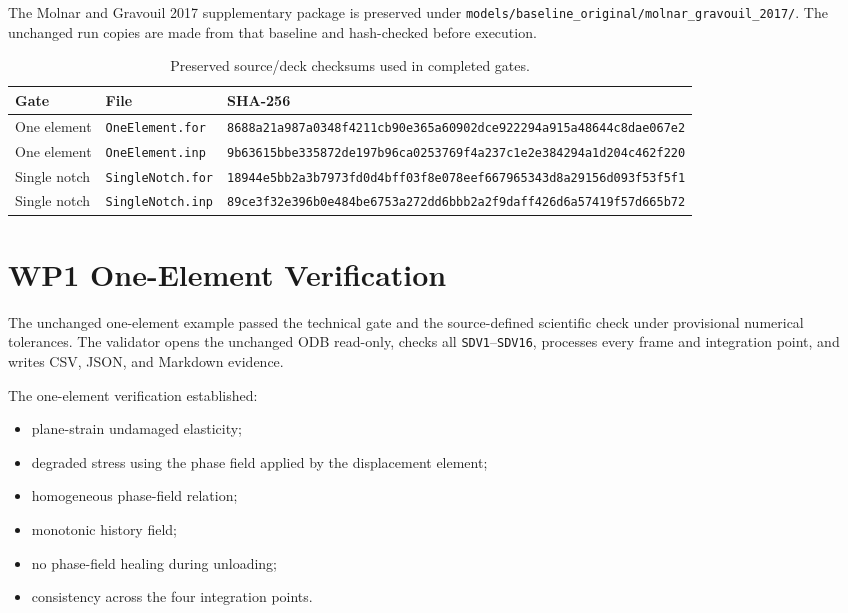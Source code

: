 \documentclass[11pt,a4paper]{article}
\begin{document}
The Molnar and Gravouil 2017 supplementary package is preserved under \texttt{models/baseline\_original/molnar\_gravouil\_2017/}. The unchanged run copies are made from that baseline and hash-checked before execution.

\begin{table}[H]
\centering
\caption{Preserved source/deck checksums used in completed gates.}
\begin{tabular}{@{}lll@{}}
\toprule
Gate & File & SHA-256 \\
\midrule
One element & \texttt{OneElement.for} & \texttt{8688a21a987a0348f4211cb90e365a60902dce922294a915a48644c8dae067e2} \\
One element & \texttt{OneElement.inp} & \texttt{9b63615bbe335872de197b96ca0253769f4a237c1e2e384294a1d204c462f220} \\
Single notch & \texttt{SingleNotch.for} & \texttt{18944e5bb2a3b7973fd0d4bff03f8e078eef667965343d8a29156d093f53f5f1} \\
Single notch & \texttt{SingleNotch.inp} & \texttt{89ce3f32e396b0e484be6753a272dd6bbb2a2f9daff426d6a57419f57d665b72} \\
\bottomrule
\end{tabular}
\end{table}

\section{WP1 One-Element Verification}

The unchanged one-element example passed the technical gate and the source-defined scientific check under provisional numerical tolerances. The validator opens the unchanged ODB read-only, checks all \texttt{SDV1}--\texttt{SDV16}, processes every frame and integration point, and writes CSV, JSON, and Markdown evidence.

The one-element verification established:
\begin{itemize}
  \item plane-strain undamaged elasticity;
  \item degraded stress using the phase field applied by the displacement element;
  \item homogeneous phase-field relation;
  \item monotonic history field;
  \item no phase-field healing during unloading;
  \item consistency across the four integration points.
\end{itemize}
\end{document}

